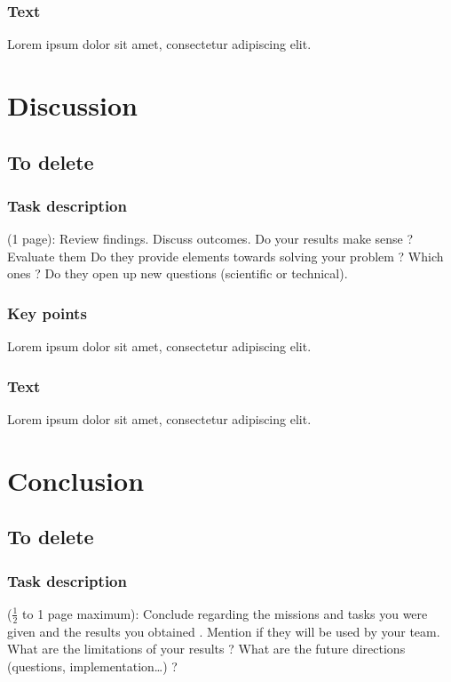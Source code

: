 \documentclass[11pt,a4paper]{article}
\begin{document}
\subsubsection{Text}

Lorem ipsum dolor sit amet, consectetur adipiscing elit.

\section{Discussion}

\subsection{To delete}

\subsubsection{Task description}
(1 page): 
Review findings.
Discuss outcomes.
Do your results make sense ? 
Evaluate them
Do they provide elements towards solving your problem ? Which ones ?
Do they open up new questions (scientific or technical).

\subsubsection{Key points}

Lorem ipsum dolor sit amet, consectetur adipiscing elit.

\subsubsection{Text}

Lorem ipsum dolor sit amet, consectetur adipiscing elit.

\section{Conclusion}

\subsection{To delete}

\subsubsection{Task description}
($\frac{1}{2}$ to 1 page maximum):
Conclude regarding the missions and tasks you were given and the 
results you obtained . Mention if they will be used by your team. 
What are the limitations of your results ?
What are the future directions (questions, implementation…) ? 
\end{document}

